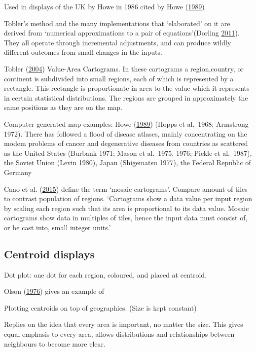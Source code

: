 \documentclass[11pt,]{article}
\begin{document}
Used in displays of the UK by Howe in 1986 cited by Howe
(\protect\hyperlink{ref-HEDP}{1989})

Tobler's method and the many implementations that `elaborated' on it are
derived from `numerical approximations to a pair of equations'(Dorling
\protect\hyperlink{ref-ACTUC}{2011}). They all operate through
incremental adjustments, and can produce wildly different outcomes from
small changes in the inputs.

Tobler (\protect\hyperlink{ref-TFYCC}{2004}) Value-Area Cartograms. In
these cartograms a region,country, or continent is subdivided into small
regions, each of which is represented by a rectangle. This rectangle is
proportionate in area to the value which it represents in certain
statistical distributions. The regions are grouped in approximately the
same positions as they are on the map.

Computer generated map examples: Howe
(\protect\hyperlink{ref-HEDP}{1989}) (Hopps et al.~1968; Armstrong
1972). There has followed a flood of disease atlases, mainly
concentrating on the modem problems of cancer and degenerative diseases
from countries as scattered as the United States (Burbank 1971; Mason et
al.~1975, 1976; Pickle et al.~1987), the Soviet Union (Levin 1980),
Japan (Shigematsu 1977), the Federal Republic of Germany

Cano et al. (\protect\hyperlink{ref-MDAC}{2015}) define the term `mosaic
cartograms'. Compare amount of tiles to contrast population of regions.
`Cartograms show a data value per input region by scaling each region
such that its area is proportional to its data value. Mosaic cartograms
show data in multiples of tiles, hence the input data must consist of,
or be cast into, small integer units.'

\hypertarget{centroid-displays}{%
\subsection{Centroid displays}\label{centroid-displays}}

Dot plot: one dot for each region, coloured, and placed at centroid.

Olson (\protect\hyperlink{ref-NAC}{1976}) gives an example of

Plotting centroids on top of geographies. (Size is kept constant)

Replies on the idea that every area is important, no matter the size.
This gives equal emphasis to every area, allows distributions and
relationships between neighbours to become more clear.
\end{document}

